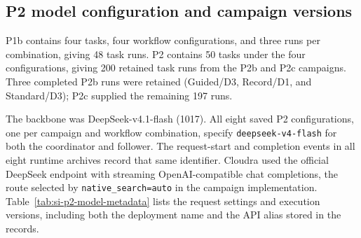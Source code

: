\subsection{P2 model configuration and campaign versions}
\label{sec:si-p2-model-metadata}

P1b contains four tasks, four workflow configurations, and three runs per combination, giving 48 task runs. P2 contains 50 tasks under the four configurations, giving 200 retained task runs from the P2b and P2c campaigns. Three completed P2b runs were retained (Guided/D3, Record/D1, and Standard/D3); P2c supplied the remaining 197 runs.

The backbone was DeepSeek-v4.1-flash (1017). All eight saved P2 configurations, one per campaign and workflow combination, specify \texttt{deepseek-v4-flash} for both the coordinator and follower. The request-start and completion events in all eight runtime archives record that same identifier. Cloudra used the official DeepSeek endpoint with streaming OpenAI-compatible chat completions, the route selected by \texttt{native\_search=auto} in the campaign implementation. Table~\ref{tab:si-p2-model-metadata} lists the request settings and execution versions, including both the deployment name and the API alias stored in the records.

